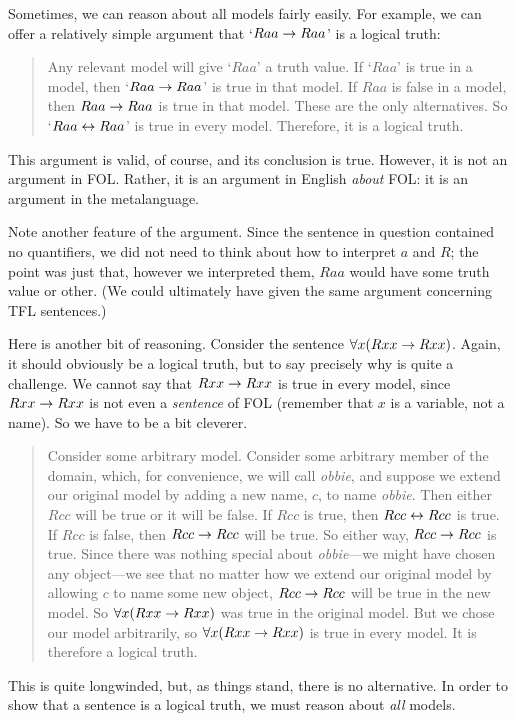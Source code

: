 Sometimes, we can reason about all models fairly easily. For example, we can offer a relatively simple argument that `$Raa\rightarrow Raa$' is a logical truth:
	\begin{quote}
		\label{allmodels1}
		Any relevant model will give `$Raa$' a truth value. If `$Raa$' is true in a model, then `$Raa \rightarrow Raa$' is true in that model. If $Raa$ is false in a model, then $Raa \rightarrow Raa$ is true in that model. These are the only alternatives. So `$Raa \leftrightarrow Raa$' is true in every model. Therefore, it is a logical truth.
	\end{quote}
This argument is valid, of course, and its conclusion is true. However, it is not an argument in FOL. Rather, it is an argument in English \emph{about} FOL: it is an argument in the metalanguage.

Note another feature of the argument. Since the sentence in question contained no quantifiers, we did not need to think about how to interpret $a$ and $R$; the point was just that, however we interpreted them, $Raa$ would have some truth value or other. (We could ultimately have given the same argument concerning TFL sentences.)

Here is another bit of reasoning. Consider the sentence $\forall x(Rxx\rightarrow Rxx)$. Again, it should obviously be a logical truth, but to say precisely why is quite a challenge. We cannot say that $Rxx \rightarrow Rxx$ is true in every model, since $Rxx \rightarrow Rxx$ is not even a \emph{sentence} of FOL (remember that $x$ is a variable, not a name). So we have to be a bit cleverer.
	\begin{quote}
		Consider some arbitrary model. Consider some arbitrary member of the domain, which, for convenience, we will call \emph{obbie}, and suppose we extend our original model by adding a new name, $c$, to name \emph{obbie}. Then either $Rcc$ will be true or it will be false. If $Rcc$ is true, then $Rcc \leftrightarrow Rcc$ is true. If $Rcc$ is false, then $Rcc \rightarrow Rcc$ will be true. So either way, $Rcc \rightarrow Rcc$ is true. Since there was nothing special about \emph{obbie}---we might have chosen any object---we see that no matter how we extend our original model by allowing $c$ to name some new object, $Rcc \rightarrow Rcc$ will be true in the new model. So $\forall x (Rxx \rightarrow Rxx)$ was true in the original model. But we chose our model arbitrarily, so $\forall x (Rxx \rightarrow Rxx)$ is true in every model. It is therefore a logical truth.
	\end{quote}
This is quite longwinded, but, as things stand, there is no alternative. In order to show that a sentence is a logical truth, we must reason about \emph{all} models.

